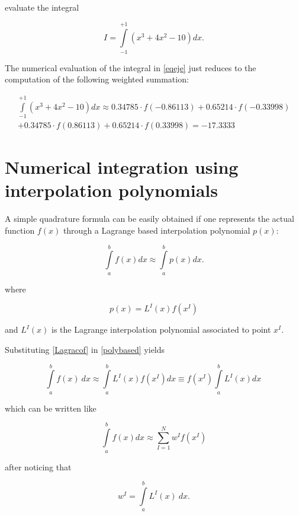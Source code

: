 evaluate the integral


\begin{equation}
I = \int\limits_{ - 1}^{ + 1} {({x^3} + 4{x^2} - 10)dx}.
 \label{eqeje}
\end{equation} 


The numerical evaluation of the integral in \eqref{eqeje} just reduces to the computation of the following weighted summation:

\begin{align*}
\int\limits_{ - 1}^{ + 1} {({x^3} + 4{x^2} - 10)dx} \approx 0.34785 \cdot f( - 0.86113) + 0.65214 \cdot f( - 0.33998) \\
 + 0.34785 \cdot f(0.86113) + 0.65214 \cdot f(0.33998) = -17.3333
\end{align*}


\section{Numerical integration using interpolation polynomials}
A simple quadrature formula can be easily obtained if one represents the actual function $f(x)$ through a Lagrange based interpolation polynomial $p(x)$:


\begin{equation}
\int\limits_a^b {f(x)dx \approx \int\limits_a^b {p(x)dx} } .
 \label{polybased}
\end{equation} 

where


\begin{equation}
p(x) = {L^I}(x)f({x^I})
 \label{Lagracof}
\end{equation} 


and ${L^I}(x)$ is the Lagrange interpolation polynomial associated to point $x^I$.

Substituting \cref{Lagracof} in \cref{polybased} yields


\[\int\limits_a^b f(x)\ dx  \approx \int\limits_a^b L^I(x)f(x^I)dx  \equiv f(x^I)\int\limits_a^b L^I(x)dx\, \]

which can be written like

\begin{equation}
\int\limits_a^b {f(x)dx}  \approx \sum\limits_{I = 1}^N w^I f(x^I)
\label{general}
\end{equation}

after noticing that

\begin{equation}
w^I = \int\limits_a^b {L^I(x)\ dx}. 
\label{pesos}
\end{equation}

